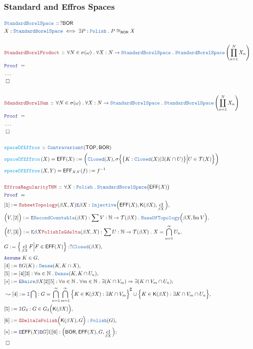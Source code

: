 \documentclass[12pt]{scrartcl}
\newcommand{\TYPE}[1]{\textcolor{NavyBlue}{\mathtt{#1}}}
\newcommand{\FUNC}[1]{\textcolor{Cerulean}{\mathtt{#1}}}
\newcommand{\LOGIC}[1]{\textcolor{Blue}{\mathtt{#1}}}
\newcommand{\THM}[1]{\textcolor{Maroon}{\mathtt{#1}}}
\renewcommand{\.}{\; . \;}
\newcommand{\de}{: \kern 0.1pc =}
\newcommand{\Act}[1]{\left( #1 \right)}
\newcommand{\Theorem}[2]{& \THM{#1} \, :: \, #2 \\ & \Proof = \\ }
\newcommand{\DeclareType}[2]{& \TYPE{#1} \, :: \, #2 \\}
\newcommand{\DefineType}[3]{& #1 : \TYPE{#2} \iff #3 \\}
\newcommand{\DeclareFunc}[2]{& \FUNC{#1} \, :: \, #2 \\}
\newcommand{\DefineNamedFunc}[4]{&  \FUNC{#1}\Act{#2} = #3 \de #4 \\}
\newcommand{\Page}[1]{ \begin{align*} #1 \end{align*}   }
\newcommand{\NoProof}{ & \ldots \\ \EndProof}
\newcommand{\Imply}{\Rightarrow}
\newcommand{\Intro}{\LOGIC{I}}
\newcommand{\Elim}{\LOGIC{E}}
\newcommand{\Nat}{\mathbb{N} }
\DeclareMathOperator*{\im}{Im}
\renewcommand{\c}{\complement}
\newcommand{\Say}[3]{& #1 \de #2 : #3, \\}
\newcommand{\Conclude}[3]{& #1 \de #2 : #3; \\}
\newcommand{\Derive}[3]{& \leadsto #1 \de #2 : #3, \\}
\newcommand{\AssumeIn}[2]{& \LOGIC{Assume} \; #1 \in #2, \\}
\newcommand{\QED}{\; \square}
\newcommand{\EndProof}{& \QED \\}
\newcommand{\Proof}{\LOGIC{Proof} \; }
\newcommand{\Inj}{\TYPE{Injective}}
\newcommand{\Contra}{\TYPE{Contravariant}}
\newcommand{\Closed}{\TYPE{Closed}}
\newcommand{\Dense}{\TYPE{Dense}}
\newcommand{\Bair}{\TYPE{Baire}}
\DeclareMathOperator*{\cl}{cl}
\newcommand{\TOP}{\mathsf{TOP}}
\newcommand{\T}{\mathcal{T}}
\newcommand{\Polish}{\TYPE{Polish}}
\newcommand{\SBS}{\TYPE{StandardBorelSpace}}
\newcommand{\BOR}{\mathsf{BOR}}
\newcommand{\Effros}{\mathsf{EFF}}
\newcommand{\K}{\mathsf{K}}
\begin{document}
\subsubsection{Standard and Effros Spaces}
\Page{
	\DeclareType{\SBS}{?\BOR}
	\DefineType{X}{\SBS}{\exists P : \Polish \. P \cong_\BOR X }
	\\
	\Theorem{StandardBorelProduct}
	{
		\forall N \in \sigma(\omega) \.
		\forall X : N \to \SBS \.
		\SBS\left(\prod_{n=1}^N X_n\right)
	}
	\NoProof
	\\
	\Theorem{SdandardBorelSum}
	{
		\forall N \in \sigma(\omega) \.
		\forall X : N \to \SBS \.
		\SBS\left(\coprod_{n=1}^N X_n\right)
	}
	\NoProof
	\\
	\DeclareFunc{spaceOfEffros}
	{
		\Contra(\TOP, \BOR)
	}
	\DefineNamedFunc{spaceOfEffros}{X}{\Effros(X)}
	{
		\bigg( \Closed(X), 
		\sigma\Big\{ \big\{ K : \Closed(X) | \exists(K  \cap U) \big\} \Big| U \in \T(X) \Big\}
		\bigg) 
	}
	\DefineNamedFunc{spaceOfEffros}{X,Y}{\Effros_{X,Y}(f)}
	{
		f^{-1}
	}
	\\
	\Theorem{EffrosRegularityTHM}
	{
		\forall X : \Polish \.
		\SBS\big(\Effros(X)\big)  
	}
	\Say{[1]}{\THM{SubsetTopology}(\beta X,X)\Elim \beta X}
	{
		\Inj\Big( \Effros(X), \K(\beta X), \cl_{\beta X} \Big)
	}
	\Say{\Big(V,[2]\Big)}
	{
		\Elim \TYPE{SecondCountable}(\beta X)
	}
	{
		\sum V : \Nat \to \T(\beta X) \.
		\TYPE{BaseOfTopology}\Big(\beta X, \im V\Big)
	}
	\Say{\Big(U,[3]\Big)}
	{
		\Elim \beta X
		\THM{PolishIsGdelta}(\beta X, X)
	}
	{
		\sum U : \Nat \to \T(\beta X) \.
		X = \bigcap^\infty_{n=1} U_n
	}
	\Say{G}
	{
		\Big\{ 
			\cl_{\beta X}  F \Big| F \in \Effros(X) 
		\Big\}
	}{   
		?\Closed(\beta X)
	}
	\AssumeIn{K}{G}
	\Say{[4]}{\Elim G(K)}{\Dense(K,K \cap X)}
	\Say{[5]}{[4][3]}
	{
		\forall n \in \Nat \. \Dense(K, K \cap U_n)
	}
	\Conclude{[*]}{\Elim \Bair \beta X [2][5]}
	{
		\forall n \in \Nat \. \forall m \in \Nat \. 
		\exists (K \cap V_m) \Imply \exists (K \cap V_m \cap U_n)
	}
	\Derive{[4]}{\Intro \bigcap}
	{
		G = \bigcap^\infty_{n=1} \bigcap^\infty_{m=1}
		 \Big\{ K \in \K(\beta X)  :  \exists K \cap V_m  \Big\}^\c 
		 \cup
		 \Big\{ K \in \K(\beta X) : \exists K \cap V_m \cap U_n \Big\}
	}
	\Say{[5]}{\Intro G_\delta}
	{
		G \in G_\delta\Big( \K(\beta X) \Big)
	}
	\Say{[6]}{ \THM{GDeltaIsPolish}\Big( \K(\beta X), G \Big)   }
	{
		\Polish(G)
	}
	\Conclude{[*]}{\Elim \Effros(X) \Elim G [1][6]}
	{
		\Big( \BOR,\Effros(X) ,G, \cl_{\beta X} \Big)   
	}
	\EndProof
}
\end{document}
